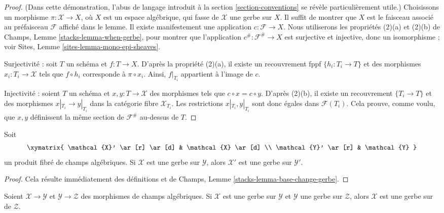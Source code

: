 \begin{proof}
(Dans cette démonstration, l'abus de langage introduit à la
section \ref{section-conventions} se révèle particulièrement utile.)
Choisissons un morphisme $\pi : \mathcal{X} \to X$, où $X$ est un espace
algébrique, qui fasse de $\mathcal{X}$ une gerbe sur $X$. Il suffit de
montrer que $X$ est le faisceau associé au préfaisceau $\mathcal{F}$ affiché
dans le lemme. Il existe manifestement une application
$c : \mathcal{F} \to X$. Nous utiliserons les propriétés (2)(a) et (2)(b) de
Champs, Lemme \ref{stacks-lemma-when-gerbe}, pour montrer que l'application
$c^\# : \mathcal{F}^\# \to X$ est surjective et injective, donc un
isomorphisme ; voir Sites, Lemme \ref{sites-lemma-mono-epi-sheaves}.

Surjectivité : soit $T$ un schéma et $f : T \to X$. D'après la propriété
(2)(a), il existe un recouvrement fppf $\{h_i : T_i \to T\}$ et des morphismes
$x_i : T_i \to \mathcal{X}$ tels que $f \circ h_i$ corresponde à
$\pi \circ x_i$. Ainsi, $f|_{T_i}$ appartient à l'image de $c$.

Injectivité : soient $T$ un schéma et $x, y : T \to \mathcal{X}$ des
morphismes tels que $c \circ x = c \circ y$. D'après (2)(b), il existe un
recouvrement $\{T_i \to T\}$ et des morphismes
$x|_{T_i} \to y|_{T_i}$ dans la catégorie fibre $\mathcal{X}_{T_i}$.
Les restrictions $x|_{T_i}, y|_{T_i}$ sont donc égales dans
$\mathcal{F}(T_i)$. Cela prouve, comme voulu, que $x, y$ définissent la même
section de $\mathcal{F}^\#$ au-dessus de $T$.
\end{proof}

\begin{lemma}
\label{lemma-base-change-gerbe}
Soit
$$
\xymatrix{
\mathcal{X}' \ar[r] \ar[d] & \mathcal{X} \ar[d] \\
\mathcal{Y}' \ar[r] & \mathcal{Y}
}
$$
un produit fibré de champs algébriques. Si $\mathcal{X}$ est une gerbe
sur $\mathcal{Y}$, alors $\mathcal{X}'$ est une gerbe sur
$\mathcal{Y}'$.
\end{lemma}

\begin{proof}
Cela résulte immédiatement des définitions et de Champs, Lemme
\ref{stacks-lemma-base-change-gerbe}.
\end{proof}

\begin{lemma}
\label{lemma-composition-gerbe}
Soient $\mathcal{X} \to \mathcal{Y}$ et
$\mathcal{Y} \to \mathcal{Z}$ des morphismes de champs algébriques. Si
$\mathcal{X}$ est une gerbe sur $\mathcal{Y}$ et $\mathcal{Y}$ une
gerbe sur $\mathcal{Z}$, alors $\mathcal{X}$ est une gerbe sur
de $\mathcal{Z}$.
\end{lemma}

